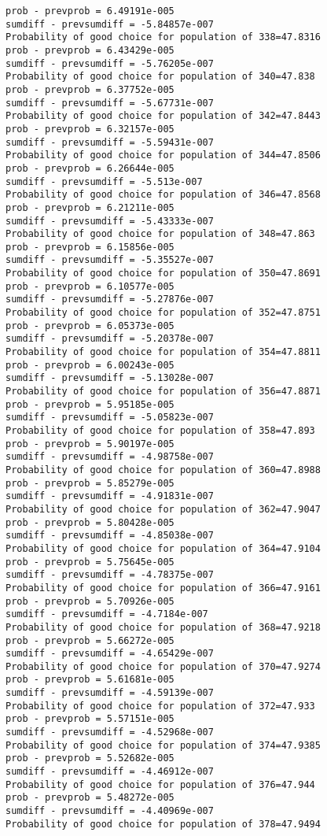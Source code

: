 \documentclass[11pt,onecolumn]{article}
\begin{document}
\begin{verbatim}
prob - prevprob = 6.49191e-005
sumdiff - prevsumdiff = -5.84857e-007
Probability of good choice for population of 338=47.8316
prob - prevprob = 6.43429e-005
sumdiff - prevsumdiff = -5.76205e-007
Probability of good choice for population of 340=47.838
prob - prevprob = 6.37752e-005
sumdiff - prevsumdiff = -5.67731e-007
Probability of good choice for population of 342=47.8443
prob - prevprob = 6.32157e-005
sumdiff - prevsumdiff = -5.59431e-007
Probability of good choice for population of 344=47.8506
prob - prevprob = 6.26644e-005
sumdiff - prevsumdiff = -5.513e-007
Probability of good choice for population of 346=47.8568
prob - prevprob = 6.21211e-005
sumdiff - prevsumdiff = -5.43333e-007
Probability of good choice for population of 348=47.863
prob - prevprob = 6.15856e-005
sumdiff - prevsumdiff = -5.35527e-007
Probability of good choice for population of 350=47.8691
prob - prevprob = 6.10577e-005
sumdiff - prevsumdiff = -5.27876e-007
Probability of good choice for population of 352=47.8751
prob - prevprob = 6.05373e-005
sumdiff - prevsumdiff = -5.20378e-007
Probability of good choice for population of 354=47.8811
prob - prevprob = 6.00243e-005
sumdiff - prevsumdiff = -5.13028e-007
Probability of good choice for population of 356=47.8871
prob - prevprob = 5.95185e-005
sumdiff - prevsumdiff = -5.05823e-007
Probability of good choice for population of 358=47.893
prob - prevprob = 5.90197e-005
sumdiff - prevsumdiff = -4.98758e-007
Probability of good choice for population of 360=47.8988
prob - prevprob = 5.85279e-005
sumdiff - prevsumdiff = -4.91831e-007
Probability of good choice for population of 362=47.9047
prob - prevprob = 5.80428e-005
sumdiff - prevsumdiff = -4.85038e-007
Probability of good choice for population of 364=47.9104
prob - prevprob = 5.75645e-005
sumdiff - prevsumdiff = -4.78375e-007
Probability of good choice for population of 366=47.9161
prob - prevprob = 5.70926e-005
sumdiff - prevsumdiff = -4.7184e-007
Probability of good choice for population of 368=47.9218
prob - prevprob = 5.66272e-005
sumdiff - prevsumdiff = -4.65429e-007
Probability of good choice for population of 370=47.9274
prob - prevprob = 5.61681e-005
sumdiff - prevsumdiff = -4.59139e-007
Probability of good choice for population of 372=47.933
prob - prevprob = 5.57151e-005
sumdiff - prevsumdiff = -4.52968e-007
Probability of good choice for population of 374=47.9385
prob - prevprob = 5.52682e-005
sumdiff - prevsumdiff = -4.46912e-007
Probability of good choice for population of 376=47.944
prob - prevprob = 5.48272e-005
sumdiff - prevsumdiff = -4.40969e-007
Probability of good choice for population of 378=47.9494

\end{verbatim}
\end{document}
